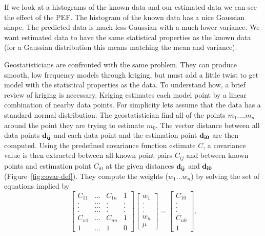 \par
If we look at a histograms of the known data and our estimated data we
can see the effect of the PEF.  The histogram of the known data has a
nice Gaussian shape.  The predicted
data is much less Gaussian with a much lower variance.  We want estimated 
data to have the same statistical properties as the known data (for
a Gaussian distribution this means matching the mean and variance).
\par
Geostatisticians are confronted with the same problem. They can produce
smooth, low frequency models through kriging, but must add a little
twist to get model with the statistical properties as the data.
To understand how, a brief review of kriging is necessary.
Kriging estimates each model point by a linear combination of nearby data 
points. For simplicity lets assume that the data has a standard
normal distribution.
The geostatistician find all of the points $m_1 .... m_n$ around the point they
are trying to estimate $m_0$. The vector distance between all data points
$\bf d_{ij}$
and each data point and the estimation point $\bf d_{i0}$ are then computed.
Using the predefined covariance function estimate $C$, a covariance
value is then extracted
between all known point pairs $C_{ij}$ and
between known points and
estimation point $C_{i0}$ at the given distances $\bf d_{ij}$  and
$\bf d_{i0}$   (Figure~\ref{fig:covar-def}).
They compute the weights   ($w_1 ... w_n$) by solving the set
of equations implied by
\begin{equation}
\left[
\begin{array}{cccc}
C_{11}  &...& C_{1n} & 1 \\
.  &...& . & . \\
.  &...& . & . \\
.  &...& . & . \\
C_{n1}  &...& C_{nn} &  1 \\
1 &...& 1 & 0
\end{array}
\right]
\left[
\begin{array}{c}
w_1 \\
. \\
. \\
. \\
w_n \\
\mu
\end{array}
\right]
=
\left[
\begin{array}{c}
C_{10} \\
. \\
. \\
. \\
C_{n0} \\
1
\end{array} \label{eq:krig}
\right] .
\end{equation}
